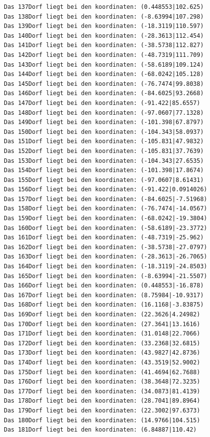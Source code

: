 \documentclass{article}
\begin{document}
\begin{verbatim}
Das 137Dorf liegt bei den koordinaten: (0.448553|102.625)
Das 138Dorf liegt bei den koordinaten: (-8.63994|107.298)
Das 139Dorf liegt bei den koordinaten: (-18.3119|110.597)
Das 140Dorf liegt bei den koordinaten: (-28.3613|112.454)
Das 141Dorf liegt bei den koordinaten: (-38.5738|112.827)
Das 142Dorf liegt bei den koordinaten: (-48.7319|111.709)
Das 143Dorf liegt bei den koordinaten: (-58.6189|109.124)
Das 144Dorf liegt bei den koordinaten: (-68.0242|105.128)
Das 145Dorf liegt bei den koordinaten: (-76.7474|99.8038)
Das 146Dorf liegt bei den koordinaten: (-84.6025|93.2668)
Das 147Dorf liegt bei den koordinaten: (-91.422|85.6557)
Das 148Dorf liegt bei den koordinaten: (-97.0607|77.1328)
Das 149Dorf liegt bei den koordinaten: (-101.398|67.8797)
Das 150Dorf liegt bei den koordinaten: (-104.343|58.0937)
Das 151Dorf liegt bei den koordinaten: (-105.831|47.9832)
Das 152Dorf liegt bei den koordinaten: (-105.831|37.7639)
Das 153Dorf liegt bei den koordinaten: (-104.343|27.6535)
Das 154Dorf liegt bei den koordinaten: (-101.398|17.8674)
Das 155Dorf liegt bei den koordinaten: (-97.0607|8.61431)
Das 156Dorf liegt bei den koordinaten: (-91.422|0.0914026)
Das 157Dorf liegt bei den koordinaten: (-84.6025|-7.51968)
Das 158Dorf liegt bei den koordinaten: (-76.7474|-14.0567)
Das 159Dorf liegt bei den koordinaten: (-68.0242|-19.3804)
Das 160Dorf liegt bei den koordinaten: (-58.6189|-23.3772)
Das 161Dorf liegt bei den koordinaten: (-48.7319|-25.962)
Das 162Dorf liegt bei den koordinaten: (-38.5738|-27.0797)
Das 163Dorf liegt bei den koordinaten: (-28.3613|-26.7065)
Das 164Dorf liegt bei den koordinaten: (-18.3119|-24.8503)
Das 165Dorf liegt bei den koordinaten: (-8.63994|-21.5507)
Das 166Dorf liegt bei den koordinaten: (0.448553|-16.878)
Das 167Dorf liegt bei den koordinaten: (8.75984|-10.9317)
Das 168Dorf liegt bei den koordinaten: (16.1168|-3.83875)
Das 169Dorf liegt bei den koordinaten: (22.3626|4.24982)
Das 170Dorf liegt bei den koordinaten: (27.3641|13.1616)
Das 171Dorf liegt bei den koordinaten: (31.0148|22.7066)
Das 172Dorf liegt bei den koordinaten: (33.2368|32.6815)
Das 173Dorf liegt bei den koordinaten: (43.9827|42.8736)
Das 174Dorf liegt bei den koordinaten: (43.3519|52.9002)
Das 175Dorf liegt bei den koordinaten: (41.4694|62.7688)
Das 176Dorf liegt bei den koordinaten: (38.3648|72.3235)
Das 177Dorf liegt bei den koordinaten: (34.0873|81.4139)
Das 178Dorf liegt bei den koordinaten: (28.7041|89.8964)
Das 179Dorf liegt bei den koordinaten: (22.3002|97.6373)
Das 180Dorf liegt bei den koordinaten: (14.9766|104.515)
Das 181Dorf liegt bei den koordinaten: (6.84887|110.42)

\end{verbatim}
\end{document}

